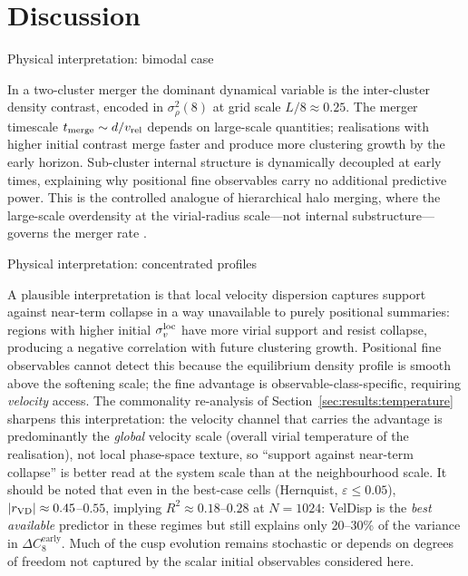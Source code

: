 \documentclass[twocolumn,linenumbers]{aastex701}
\makeatletter
\def\subsection{\@startsection{subsection}{2}{\z@}{9pt plus 1pt minus 1pt}{4pt}%
  {\normalsize\bfseries\center}}
\newcommand{\dCearly}{\Delta C_{8}^{\mathrm{early}}}
\newcommand{\sigrho}{\sigma^{2}_{\rho}}
\newcommand{\heps}{\varepsilon}
\makeatother
\begin{document}
\section{Discussion}
\label{sec:discussion}

\subsection{Physical interpretation: bimodal case}

In a two-cluster merger the dominant dynamical variable is the inter-cluster
density contrast, encoded in $\sigrho(8)$ at grid scale $L/8 \approx 0.25$.
The merger timescale $t_{\rm merge} \sim d/v_{\rm rel}$ depends on
large-scale quantities; realisations with higher initial contrast merge
faster and produce more clustering growth by the early horizon.
Sub-cluster internal structure is dynamically decoupled at early times,
explaining why positional fine observables carry no additional predictive
power.
This is the controlled analogue of hierarchical halo merging, where the
large-scale overdensity at the virial-radius scale---not internal
substructure---governs the merger rate \citep{White1996}.

\subsection{Physical interpretation: concentrated profiles}

A plausible interpretation is that local velocity dispersion captures
support against near-term collapse in a way unavailable to purely
positional summaries: regions with higher initial $\sigma_v^{\rm loc}$
have more virial support and resist collapse, producing a negative
correlation with future clustering growth.
Positional fine observables cannot detect this because the equilibrium
density profile is smooth above the softening scale; the fine advantage
is observable-class-specific, requiring \emph{velocity} access.
The commonality re-analysis of Section~\ref{sec:results:temperature}
sharpens this interpretation: the velocity channel that carries the
advantage is predominantly the \emph{global} velocity scale (overall
virial temperature of the realisation), not local phase-space texture, so
``support against near-term collapse'' is better read at the system scale
than at the neighbourhood scale.
It should be noted that even in the best-case cells (Hernquist,
$\heps \le 0.05$), $|r_{\rm VD}| \approx 0.45$--$0.55$, implying
$R^2 \approx 0.18$--$0.28$ at $N = 1024$: VelDisp is the \emph{best available}
predictor in these regimes but still explains only 20--30\% of the
variance in $\dCearly$.
Much of the cusp evolution remains stochastic or depends on degrees of
freedom not captured by the scalar initial observables considered here.
\end{document}
